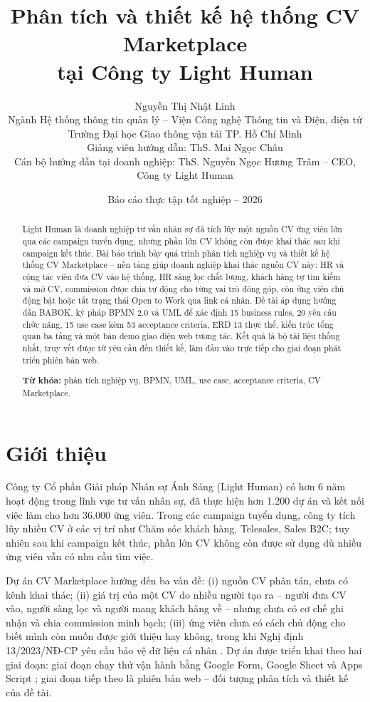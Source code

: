 \documentclass[11pt,a4paper]{article}
\title{\vspace{-1.2cm}\textbf{Phân tích và thiết kế hệ thống CV Marketplace\\tại Công ty Light Human}}
\author{Nguyễn Thị Nhật Linh\\[2pt]
\small Ngành Hệ thống thông tin quản lý – Viện Công nghệ Thông tin và Điện, điện tử\\
\small Trường Đại học Giao thông vận tải TP. Hồ Chí Minh\\[4pt]
\small Giảng viên hướng dẫn: ThS. Mai Ngọc Châu\\
\small Cán bộ hướng dẫn tại doanh nghiệp: ThS. Nguyễn Ngọc Hương Trâm – CEO, Công ty Light Human}
\date{\small Báo cáo thực tập tốt nghiệp – 2026}
\begin{document}
\maketitle

\begin{abstract}
\noindent Light Human là doanh nghiệp tư vấn nhân sự đã tích lũy một nguồn CV ứng viên lớn qua các campaign tuyển dụng, nhưng phần lớn CV không còn được khai thác sau khi campaign kết thúc. Bài báo trình bày quá trình phân tích nghiệp vụ và thiết kế hệ thống CV Marketplace – nền tảng giúp doanh nghiệp khai thác nguồn CV này: HR và cộng tác viên đưa CV vào hệ thống, HR sàng lọc chất lượng, khách hàng tự tìm kiếm và mở CV, commission được chia tự động cho từng vai trò đóng góp, còn ứng viên chủ động bật hoặc tắt trạng thái Open to Work qua link cá nhân. Đề tài áp dụng hướng dẫn BABOK, ký pháp BPMN 2.0 và UML để xác định 15 business rules, 20 yêu cầu chức năng, 15 use case kèm 53 acceptance criteria, ERD 13 thực thể, kiến trúc tổng quan ba tầng và một bản demo giao diện web tương tác. Kết quả là bộ tài liệu thống nhất, truy vết được từ yêu cầu đến thiết kế, làm đầu vào trực tiếp cho giai đoạn phát triển phiên bản web.

\medskip\noindent\textbf{Từ khóa:} phân tích nghiệp vụ, BPMN, UML, use case, acceptance criteria, CV Marketplace.
\end{abstract}

\section{Giới thiệu}
Công ty Cổ phần Giải pháp Nhân sự Ánh Sáng (Light Human) có hơn 6 năm hoạt động trong lĩnh vực tư vấn nhân sự, đã thực hiện hơn 1.200 dự án và kết nối việc làm cho hơn 36.000 ứng viên. Trong các campaign tuyển dụng, công ty tích lũy nhiều CV ở các vị trí như Chăm sóc khách hàng, Telesales, Sales B2C; tuy nhiên sau khi campaign kết thúc, phần lớn CV không còn được sử dụng dù nhiều ứng viên vẫn có nhu cầu tìm việc.

Dự án CV Marketplace hướng đến ba vấn đề: (i) nguồn CV phân tán, chưa có kênh khai thác; (ii) giá trị của một CV do nhiều người tạo ra – người đưa CV vào, người sàng lọc và người mang khách hàng về – nhưng chưa có cơ chế ghi nhận và chia commission minh bạch; (iii) ứng viên chưa có cách chủ động cho biết mình còn muốn được giới thiệu hay không, trong khi Nghị định 13/2023/NĐ-CP yêu cầu bảo vệ dữ liệu cá nhân \cite{nd13}. Dự án được triển khai theo hai giai đoạn: giai đoạn chạy thử vận hành bằng Google Form, Google Sheet và Apps Script \cite{lh_admin,lh_kh}; giai đoạn tiếp theo là phiên bản web – đối tượng phân tích và thiết kế của đề tài.
\end{document}
